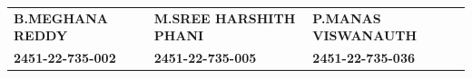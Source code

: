 \documentclass[12pt,a4paper]{article}
\begin{document}
\vfill

\noindent
\begin{tabular*}{\textwidth}{@{\extracolsep{\fill}}lll@{}}
    \textbf{B.MEGHANA REDDY}       & \textbf{M.SREE HARSHITH PHANI} & \textbf{P.MANAS VISWANAUTH} \\[0.15cm]
    \textbf{2451-22-735-002}       & \textbf{2451-22-735-005}       & \textbf{2451-22-735-036}
\end{tabular*}
\end{document}
